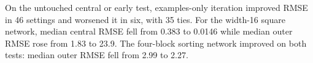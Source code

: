 On the untouched central or early test, examples-only iteration improved RMSE in 46 settings and worsened it in six, with 35 ties. For the width-16 square network, median central RMSE fell from 0.383 to 0.0146 while median outer RMSE rose from 1.83 to 23.9. The four-block sorting network improved on both tests: median outer RMSE fell from 2.99 to 2.27.
